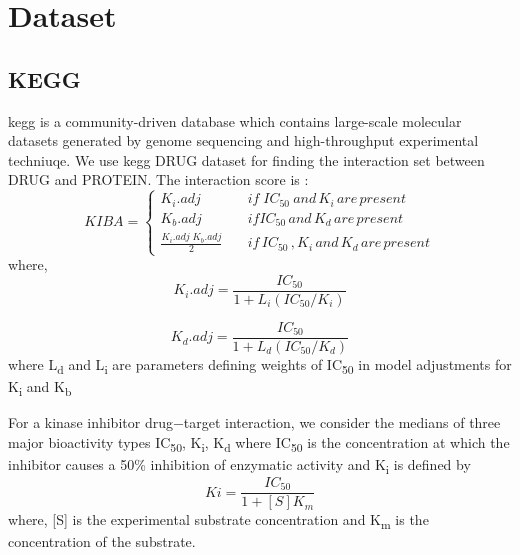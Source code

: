\section{Dataset}

\subsection{KEGG}
\acrfull{kegg} is a community-driven database which contains large-scale molecular datasets generated by genome sequencing and high-throughput experimental techniuqe.\cite{Kanehisa2000, ozturk2018deepdta} We use \acrshort{kegg} DRUG dataset for finding the interaction set between DRUG and PROTEIN. The interaction score is :
\begin{equation}
  KIBA = \begin{cases}
    K_i . {adj} & \quad {if} \; {IC_{50}\: and\, K_i \,are\, present} \\
    K_b.{adj} & \quad {if}  {IC_{50} \, and \, K_d \, are \, present} \\
    \frac{K_i . {adj} \; K_b.{adj}}{2} & \quad {if\, IC_{50}\,,K_i\, and \,K_d\, are\, present}
  \end{cases}
   \label{eq:kiba}
\end{equation}
where,
\begin{equation}
K_i.{adj} = \frac{IC_{50}}{1 + L_i(IC_{50}/K_i)}
\label{eq:ki_adj}
\end{equation}

\begin{equation}
K_d.{adj} = \frac{IC_{50}}{1 + L_d(IC_{50}/K_d)}
\end{equation}
where L\textsubscript{d} and L\textsubscript{i} are parameters defining weights of IC\textsubscript{50} in model adjustments for K\textsubscript{i} and K\textsubscript{b} 

For a kinase inhibitor drug−target interaction, we consider the medians of three major bioactivity types IC\textsubscript{50}, K\textsubscript{i}, K\textsubscript{d} where
IC\textsubscript{50} \cite{Tang2013} is the concentration at which the inhibitor causes a 50\% inhibition of enzymatic activity and K\textsubscript{i} is defined by \begin{equation}
    Ki = \frac{IC_{50}} {1 + [S]  K_m}
    \label{eq:ki}
\end{equation} 
where,  [{S}] is the experimental substrate concentration and K\textsubscript{m} is the concentration of the substrate.

